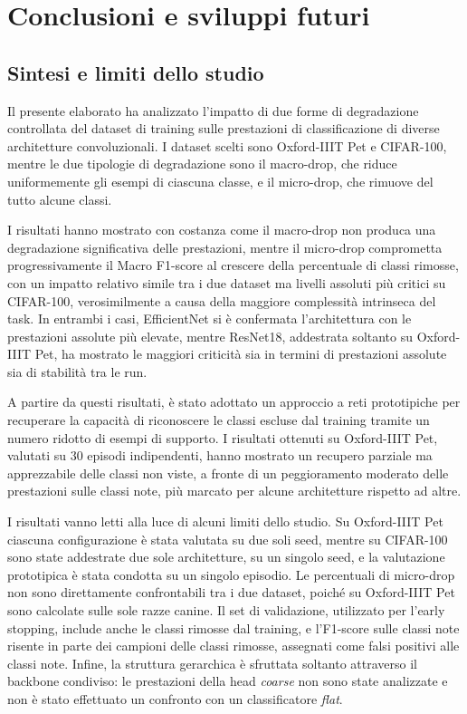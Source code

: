 \chapter{Conclusioni e sviluppi futuri}

\section{Sintesi e limiti dello studio}
Il presente elaborato ha analizzato l'impatto di due forme di degradazione controllata del dataset di training sulle prestazioni di classificazione di diverse architetture convoluzionali.
I dataset scelti sono Oxford-IIIT Pet e CIFAR-100, mentre le due tipologie di degradazione sono il macro-drop, che riduce uniformemente gli esempi di ciascuna classe, e il micro-drop, che rimuove del tutto alcune classi.

I risultati hanno mostrato con costanza come il macro-drop non produca una degradazione significativa delle prestazioni, 
mentre il micro-drop comprometta progressivamente il Macro F1-score al crescere della percentuale di classi rimosse, con un impatto relativo simile tra i due dataset ma livelli assoluti più critici su CIFAR-100, 
verosimilmente a causa della maggiore complessità intrinseca del task. In entrambi i casi, 
EfficientNet si è confermata l'architettura con le prestazioni assolute più elevate, mentre ResNet18, addestrata soltanto su Oxford-IIIT Pet, ha mostrato le maggiori criticità sia in termini di prestazioni assolute sia di stabilità tra le run.

A partire da questi risultati, è stato adottato un approccio a reti prototipiche per recuperare la capacità di riconoscere le classi escluse dal training tramite un numero ridotto di esempi di supporto. 
I risultati ottenuti su Oxford-IIIT Pet, valutati su $30$ episodi indipendenti, hanno mostrato un recupero parziale ma apprezzabile delle classi non viste, a fronte di un peggioramento moderato delle prestazioni sulle classi note, 
più marcato per alcune architetture rispetto ad altre.

I risultati vanno letti alla luce di alcuni limiti dello studio. Su Oxford-IIIT Pet ciascuna configurazione è stata valutata su due soli seed, mentre su CIFAR-100 sono state addestrate due sole architetture, su un singolo seed, e la valutazione prototipica è stata condotta su un singolo episodio. Le percentuali di micro-drop non sono direttamente confrontabili tra i due dataset, poiché su Oxford-IIIT Pet sono calcolate sulle sole razze canine. Il set di validazione, utilizzato per l'early stopping, include anche le classi rimosse dal training, e l'F1-score sulle classi note risente in parte dei campioni delle classi rimosse, assegnati come falsi positivi alle classi note. Infine, la struttura gerarchica è sfruttata soltanto attraverso il backbone condiviso: le prestazioni della head \emph{coarse} non sono state analizzate e non è stato effettuato un confronto con un classificatore \emph{flat}.

